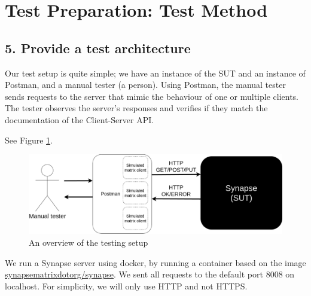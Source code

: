 \documentclass{article}
\begin{document}
\section*{Test Preparation: Test Method}
\subsection*{5. Provide a test architecture}
Our test setup is quite simple; we have an instance of the SUT and an instance of Postman, and a manual tester (a person). Using Postman, the manual tester sends requests to the server that mimic the behaviour of one or multiple clients. The tester observes the server's responses and verifies if they match the documentation of the Client-Server API.

\noindent See Figure \ref{fig:testing}.
\begin{figure}[h]
    \centering
    \includegraphics[width=0.8\linewidth]{Testing.drawio.png}
    \caption{An overview of the testing setup}
    \label{fig:testing}
\end{figure}

\noindent We run a Synapse server using docker, by running a container based on the image \href{https://hub.docker.com/r/matrixdotorg/}{synapsematrixdotorg/synapse}. We sent all requests to the default port 8008 on localhost. For simplicity, we will only use HTTP and not HTTPS.
\end{document}
